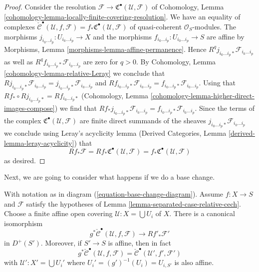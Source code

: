\begin{proof}
Consider the resolution
$\mathcal{F} \to {\mathfrak C}^\bullet(\mathcal{U}, \mathcal{F})$ of
Cohomology, Lemma \ref{cohomology-lemma-locally-finite-covering-resolution}.
We have an equality of complexes
$\check{\mathcal{C}}^\bullet(\mathcal{U}, f, \mathcal{F}) =
f_*{\mathfrak C}^\bullet(\mathcal{U}, \mathcal{F})$
of quasi-coherent $\mathcal{O}_S$-modules.
The morphisms $j_{i_0 \ldots i_p} : U_{i_0 \ldots i_p} \to X$
and the morphisms $f_{i_0 \ldots i_p} : U_{i_0 \ldots i_p} \to S$
are affine by Morphisms, Lemma \ref{morphisms-lemma-affine-permanence}.
Hence $R^qj_{i_0 \ldots i_p *}\mathcal{F}_{i_0 \ldots i_p}$
as well as $R^qf_{i_0 \ldots i_p *}\mathcal{F}_{i_0 \ldots i_p}$
are zero for $q > 0$. By
Cohomology, Lemma \ref{cohomology-lemma-relative-Leray}
we conclude that
$Rj_{i_0 \ldots i_p *}\mathcal{F}_{i_0 \ldots i_p} =
j_{i_0 \ldots i_p *}\mathcal{F}_{i_0 \ldots i_p}$ and
$Rf_{i_0 \ldots i_p *}\mathcal{F}_{i_0 \ldots i_p} =
f_{i_0 \ldots i_p *}\mathcal{F}_{i_0 \ldots i_p}$.
Using that $Rf_* \circ Rj_{i_0 \ldots i_p *} = Rf_{i_0 \ldots i_p *}$
(Cohomology, Lemma \ref{cohomology-lemma-higher-direct-images-compose})
we find that
$Rf_*j_{i_0 \ldots i_p *}\mathcal{F}_{i_0 \ldots i_p} =
f_{i_0 \ldots i_p *}\mathcal{F}_{i_0 \ldots i_p}$.
Since the terms of the complex
${\mathfrak C}^\bullet(\mathcal{U}, \mathcal{F})$ are finite direct
summands of the sheaves $j_{i_0 \ldots i_p *}\mathcal{F}_{i_0 \ldots i_p}$
we conclude using Leray's acyclicity lemma
(Derived Categories, Lemma \ref{derived-lemma-leray-acyclicity})
that
$$
Rf_* \mathcal{F} =
Rf_*{\mathfrak C}^\bullet(\mathcal{U}, \mathcal{F}) =
f_*{\mathfrak C}^\bullet(\mathcal{U}, \mathcal{F})
$$
as desired.
\end{proof}

\noindent
Next, we are going to consider what happens if we do a base change.

\begin{lemma}
\label{lemma-base-change-complex}
With notation as in diagram (\ref{equation-base-change-diagram}).
Assume $f : X \to S$ and $\mathcal{F}$ satisfy the hypotheses of
Lemma \ref{lemma-separated-case-relative-cech}. Choose a finite
affine open covering $\mathcal{U} : X = \bigcup U_i$ of $X$.
There is a canonical isomorphism
$$
g^*\check{\mathcal{C}}^\bullet(\mathcal{U}, f, \mathcal{F})
\longrightarrow
Rf'_*\mathcal{F}'
$$
in $D^{+}(S')$. Moreover, if $S' \to S$ is affine, then in fact
$$
g^*\check{\mathcal{C}}^\bullet(\mathcal{U}, f, \mathcal{F})
=
\check{\mathcal{C}}^\bullet(\mathcal{U}', f', \mathcal{F}')
$$
with $\mathcal{U}' : X' = \bigcup U_i'$ where
$U_i' = (g')^{-1}(U_i) = U_{i, S'}$ is also affine.
\end{lemma}

